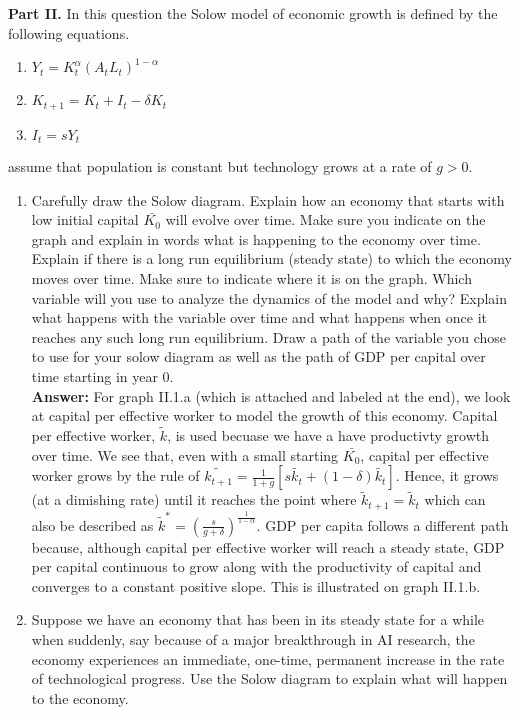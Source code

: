 \documentclass[11pt]{SelfArxOneColBMN}
\begin{document}
\textbf{Part II. }In this question the Solow model of economic growth is defined by the following equations.
\begin{enumerate}
    \item $Y_t = K_t^\alpha(A_tL_t)^{1 - \alpha}$
    \item $K_{t+1} = K_t + I_t - \delta K_t$
    \item $I_t = sY_t$
\end{enumerate}
assume that population is constant but technology grows at a rate of $g > 0$.
\begin{enumerate}
  \item Carefully draw the Solow diagram. Explain how an economy that starts with low initial capital $\bar{K_0}$ will evolve over time. Make sure you indicate on the graph and explain in words what is happening to the economy over time.\\
  Explain if there is a long run equilibrium (steady state) to which the economy moves over time. Make sure to indicate where it is on the graph. Which variable will you use to analyze the dynamics of the model and why? Explain what happens with the variable over time and what happens when once it reaches any such long run equilibrium. Draw a path of the variable you chose to use for your solow diagram as well as the path of GDP per capital over time starting in year 0.\\
  \textbf{Answer: }For graph II.1.a (which is attached and labeled at the end), we look at capital per effective worker to model the growth of this economy. Capital per effective worker, $\widetilde{k}$, is used becuase we have a have productivty growth over time. We see that, even with a small starting $\bar{K_0}$, capital per effective worker grows by the rule of $\widetilde{k_{t+1}} = \frac{1}{1 + g}[s\widetilde{k_t} + (1 - \delta)\widetilde{k_t}]$. Hence, it grows (at a dimishing rate) until it reaches the point where $\widetilde{k}_{t+1} = \widetilde{k}_t$ which can also be described as $\widetilde{k}^* = (\frac{s}{g + \delta})^\frac{1}{1 - \alpha}$. GDP per capita follows a different path because, although capital per effective worker will reach a steady state, GDP per capital continuous to grow along with the productivity of capital and converges to a constant positive slope. This is illustrated on graph II.1.b.
  \item Suppose we have an economy that has been in its steady state for a while when suddenly, say because of a major breakthrough in AI research, the economy experiences an immediate, one-time, permanent increase in the rate of technological progress. Use the Solow diagram to explain what will happen to the economy.\\

\end{enumerate}
\end{document}
